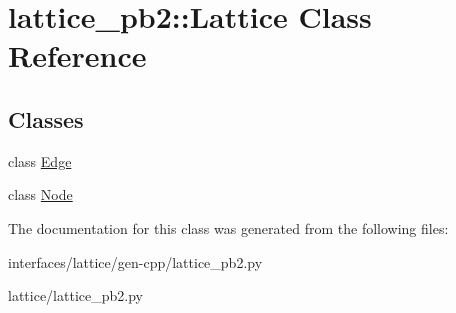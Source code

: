 \hypertarget{classlattice__pb2_1_1Lattice}{
\section{lattice\_\-pb2::Lattice Class Reference}
\label{classlattice__pb2_1_1Lattice}
}
\subsection*{Classes}
\begin{DoxyCompactItemize}
\item 
class \hyperlink{classlattice__pb2_1_1Lattice_1_1Edge}{Edge}
\item 
class \hyperlink{classlattice__pb2_1_1Lattice_1_1Node}{Node}
\end{DoxyCompactItemize}


The documentation for this class was generated from the following files:\begin{DoxyCompactItemize}
\item 
interfaces/lattice/gen-\/cpp/lattice\_\-pb2.py\item 
lattice/lattice\_\-pb2.py\end{DoxyCompactItemize}

